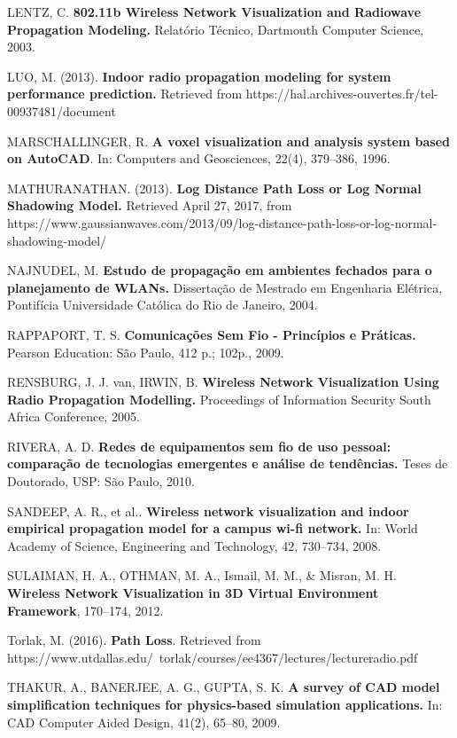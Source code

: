 \documentclass[
	12pt,				%
	openright,			%
	twoside,			%
	a4paper,			%
	english,			%
	french,				%
	spanish,			%
	brazil				%
	]{abntex2}
\begin{document}
\noindent
LENTZ, C. \textbf{802.11b Wireless Network Visualization and Radiowave Propagation Modeling.} Relatório Técnico, Dartmouth Computer Science, 2003.

\noindent
LUO, M. (2013). \textbf{Indoor radio propagation modeling for system performance prediction.} Retrieved from https://hal.archives-ouvertes.fr/tel-00937481/document

\noindent
MARSCHALLINGER, R. \textbf{A voxel visualization and analysis system based on AutoCAD}. In: Computers and Geosciences, 22(4), 379–386, 1996.

\noindent
MATHURANATHAN. (2013). \textbf{Log Distance Path Loss or Log Normal Shadowing Model.} Retrieved April 27, 2017, from https://www.gaussianwaves.com/2013/09/log-distance-path-loss-or-log-normal-shadowing-model/

\noindent
NAJNUDEL, M. \textbf{Estudo de propagação em ambientes fechados para o planejamento de WLANs.} Dissertação de Mestrado em Engenharia Elétrica, Pontifícia Universidade Católica do Rio de Janeiro, 2004.

\noindent
RAPPAPORT, T. S. \textbf{Comunicações Sem Fio - Princípios e Práticas.} Pearson Education: São Paulo, 412 p.; 102p., 2009.

\noindent
RENSBURG, J. J. van, IRWIN, B. \textbf{Wireless Network Visualization Using Radio Propagation Modelling.} Proceedings of Information Security South Africa Conference, 2005.

\noindent
RIVERA, A. D. \textbf{Redes de equipamentos sem fio de uso pessoal: comparação de tecnologias emergentes e análise de tendências.} Teses de Doutorado, USP: São Paulo, 2010.

\noindent
SANDEEP, A. R., et al.. \textbf{Wireless network visualization and indoor empirical propagation model for a campus wi-fi network.} In: World Academy of Science, Engineering and Technology, 42, 730–734, 2008.

\noindent
SULAIMAN, H. A., OTHMAN, M. A., Ismail, M. M., \& Misran, M. H. \textbf{Wireless Network Visualization in 3D Virtual Environment Framework}, 170–174, 2012.

\noindent
Torlak, M. (2016). \textbf{Path Loss}. Retrieved from https://www.utdallas.edu/~torlak/courses/ee4367/lectures/lectureradio.pdf

\noindent
THAKUR, A., BANERJEE, A. G., GUPTA, S. K. \textbf{A survey of CAD model simplification techniques for physics-based simulation applications.} In: CAD Computer Aided Design, 41(2), 65–80, 2009.
\end{document}

